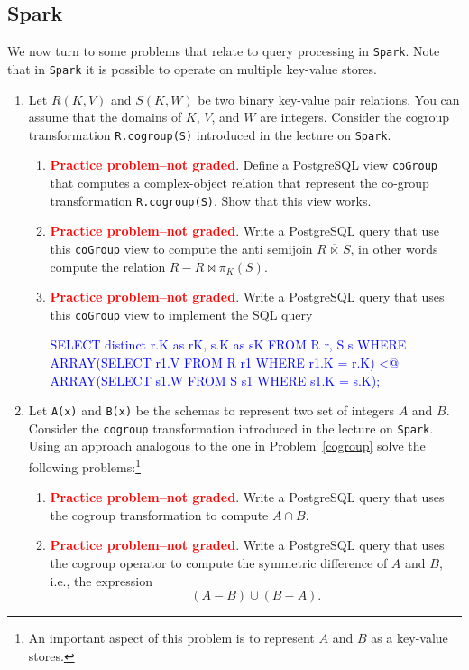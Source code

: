 \documentclass[10pt]{article}
\renewenvironment{alltt}{\vspace{-0.75\baselineskip}\begin{oldalltt}}{\end{oldalltt}\vspace{+0.50\baselineskip}}
\begin{document}
\subsection{Spark}
We now turn to some problems that relate to query processing in {\tt Spark}.  Note that in {\tt Spark} it is possible to operate on multiple
key-value stores.
\begin{enumerate}[resume]
\item\label{cogroup} 
Let $R(K,V)$ and $S(K,W)$ be two binary key-value pair relations.
You can assume that the domains of $K$, $V$, and $W$ are integers.
Consider the cogroup transformation {\tt R.cogroup(S)} introduced in the
lecture on {\tt Spark}.  

\begin{enumerate}
\item \textcolor{red}{\bf Practice problem--not graded}. 
Define a PostgreSQL view {\tt coGroup} that computes a complex-object relation that represent the co-group transformation {\tt R.cogroup(S)}.
Show that this view works.

\item \textcolor{red}{\bf Practice problem--not graded}. 
Write a PostgreSQL query that use this {\tt coGroup} view to compute the anti semijoin
$R\, \overline{\ltimes}\, S$, in other words compute the relation $R - R \bowtie \pi_{K}(S)$.

\item \textcolor{red}{\bf Practice problem--not graded}. 
Write a PostgreSQL query that uses this {\tt coGroup} view to implement
the SQL query

\begin{alltt}\textcolor{blue}{
 SELECT distinct r.K as rK, s.K as sK
 FROM   R r, S s
 WHERE  ARRAY(SELECT r1.V
              FROM   R r1
              WHERE  r1.K = r.K) <@ ARRAY(SELECT s1.W
                                          FROM	  S s1
                                          WHERE  s1.K = s.K);
}\end{alltt}                                                  

\end{enumerate}


\item  Let {\tt A(x)} and {\tt B(x)} be the schemas to represent two set of integers $A$ and $B$.
Consider the {\tt cogroup} transformation introduced in the
lecture on {\tt Spark}.
Using an approach analogous to the one in Problem~\ref{cogroup} solve
the following problems:\footnote{An important aspect of this problem is to represent $A$ and $B$ as a key-value stores.}

\begin{enumerate}
\item \textcolor{red}{\bf Practice problem--not graded}.  Write a PostgreSQL query that uses the cogroup transformation
to compute $A \cap B$.

\item \textcolor{red}{\bf Practice problem--not graded}. Write a PostgreSQL query that uses the cogroup operator
to compute the symmetric difference of $A$ and $B$, i.e., the expression
$$(A - B) \cup (B-A).$$
\end{enumerate}
\end{enumerate}
\end{document}

